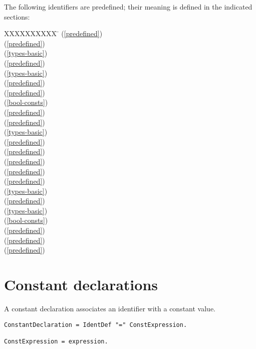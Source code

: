 \documentclass[12pt]{article}
\begin{document}
The following identifiers are predefined; their meaning is defined in the indicated sections:
\begin{tabbing}
    XXXXXXXXXX \= \kill
    \ABS \> (\ref{predefined}) \\
    \ASH \> (\ref{predefined}) \\
    \BOOLEAN \> (\ref{types-basic}) \\
    \CAP \> (\ref{predefined}) \\
    \CHAR \> (\ref{types-basic}) \\
    \COPY \> (\ref{predefined}) \\
    \DEC \> (\ref{predefined}) \\
    \FALSE \> (\ref{bool-consts}) \\
    \HALT \> (\ref{predefined}) \\
    \INC \> (\ref{predefined}) \\
    \INTEGER \> (\ref{types-basic}) \\
    \LEN \> (\ref{predefined}) \\
    \MAX \> (\ref{predefined}) \\
    \MIN \> (\ref{predefined}) \\
    \ODD \> (\ref{predefined}) \\
    \ORD \> (\ref{predefined}) \\
    \REAL \> (\ref{types-basic}) \\
    \SIZE \> (\ref{predefined}) \\
    \STRING \> (\ref{types-basic}) \\
    \TRUE \>  (\ref{bool-consts}) \\
    \WriteInt \> (\ref{predefined}) \\
    \WriteBoolean \> (\ref{predefined}) \\
    \WriteLn \> (\ref{predefined}) \\
\end{tabbing}

\section{Constant declarations}

A constant declaration associates an identifier with a constant value.

\begin{lstlisting}[style=ebnf]
ConstantDeclaration = IdentDef "=" ConstExpression. 

ConstExpression = expression.
\end{lstlisting}
\end{document}

